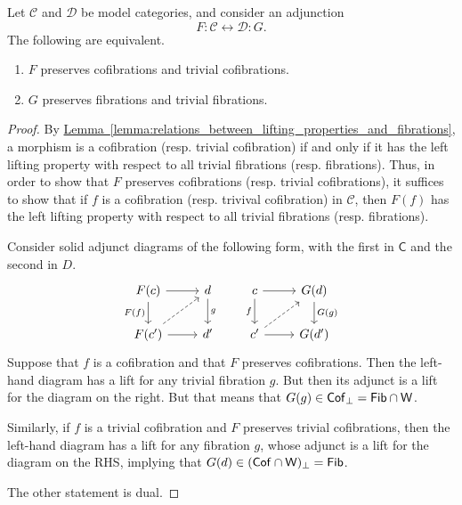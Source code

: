 \documentclass[main.tex]{subfiles}
\begin{document}
\begin{proposition}
  \label{prop:equivalent_conditions_for_quillen_adjunction}
  Let $\mathcal{C}$ and $\mathcal{D}$ be model categories, and consider an adjunction
  \begin{equation*}
    F : \mathcal{C} \leftrightarrow \mathcal{D} : G.
  \end{equation*}
  The following are equivalent.
  \begin{enumerate}
    \item $F$ preserves cofibrations and trivial cofibrations.

    \item $G$ preserves fibrations and trivial fibrations.
  \end{enumerate}
\end{proposition}
\begin{proof}
  By \hyperref[lemma:relations_between_lifting_properties_and_fibrations]{Lemma~\ref*{lemma:relations_between_lifting_properties_and_fibrations}}, a morphism is a cofibration (resp. trivial cofibration) if and only if it has the left lifting property with respect to all trivial fibrations (resp. fibrations). Thus, in order to show that $F$ preserves cofibrations (resp. trivial cofibrations), it suffices to show that if $f$ is a cofibration (resp. trivival cofibration) in $\mathcal{C}$, then $F(f)$ has the left lifting property with respect to all trivial fibrations (resp. fibrations).

  Consider solid adjunct diagrams of the following form, with the first in $\mathsf{C}$ and the second in $D$.
  \begin{equation*}
    \begin{tikzcd}
      F(c)
      \arrow[r]
      \arrow[d, swap, "F(f)"]
      & d
      \arrow[d, "g"]
      \\
      F(c')
      \arrow[r]
      \arrow[ur, dashed]
      & d'
    \end{tikzcd}
    \qquad
    \begin{tikzcd}
      c
      \arrow[r]
      \arrow[d, swap, "f"]
      & G(d)
      \arrow[d, "G(g)"]
      \\
      c'
      \arrow[r]
      \arrow[ur, dashed]
      & G(d')
    \end{tikzcd}
  \end{equation*}
  Suppose that $f$ is a cofibration and that $F$ preserves cofibrations. Then the left-hand diagram has a lift for any trivial fibration $g$. But then its adjunct is a lift for the diagram on the right. But that means that $G(g) \in \mathsf{Cof}_{\perp} = \mathsf{Fib} \cap \mathsf{W}$.

  Similarly, if $f$ is a trivial cofibration and $F$ preserves trivial cofibrations, then the left-hand diagram has a lift for any fibration $g$, whose adjunct is a lift for the diagram on the RHS, implying that $G(d) \in (\mathsf{Cof} \cap \mathsf{W})_{\perp} = \mathsf{Fib}$.

  The other statement is dual.
\end{proof}
\end{document}
